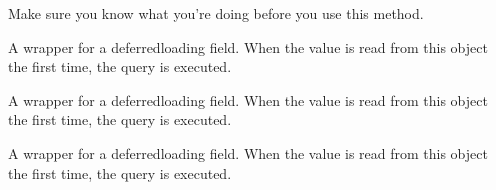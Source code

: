 \documentclass[letterpaper,10pt,english]{sphinxmanual}
\begin{document}
\begin{fulllineitems}
\begin{fulllineitems}
\sphinxAtStartPar
Make sure you know what you’re doing before you use this method.

\end{fulllineitems}


\begin{fulllineitems}
\label{\detokenize{pages_app.models:id26}}
\pysigstartsignatures
\pysigline
{}
\pysigstopsignatures
\sphinxAtStartPar
A wrapper for a deferred\sphinxhyphen{}loading field. When the value is read from this
object the first time, the query is executed.

\end{fulllineitems}


\begin{fulllineitems}
\label{\detokenize{pages_app.models:id27}}
\pysigstartsignatures
\pysigline
{}
\pysigstopsignatures
\sphinxAtStartPar
A wrapper for a deferred\sphinxhyphen{}loading field. When the value is read from this
object the first time, the query is executed.

\end{fulllineitems}


\begin{fulllineitems}
\label{\detokenize{pages_app.models:pages_app.models.Block.updated_at}}
\pysigstartsignatures
\pysigline
{}
\pysigstopsignatures
\sphinxAtStartPar
A wrapper for a deferred\sphinxhyphen{}loading field. When the value is read from this
object the first time, the query is executed.

\end{fulllineitems}


\end{fulllineitems}

\end{document}

